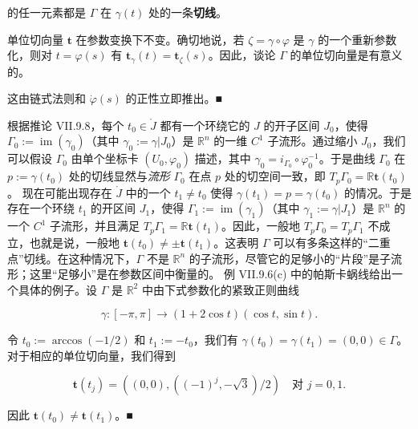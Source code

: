 的任一元素都是 $ \Gamma $ 在 $ \gamma(t) $ 处的一条\textbf{切线}。

\begin{remark}

\begin{items}
\item

单位切向量 $ \mathbf{t} $ 在参数变换下不变。确切地说，若 $ \zeta = \gamma \circ \varphi $ 是 $ \gamma $ 的一个重新参数化，则对 $ t = \varphi(s) $ 有 $ \mathbf{t}_{\gamma}(t) = \mathbf{t}_{\zeta}(s) $。因此，谈论 $ \Gamma $ 的单位切向量是有意义的。

\proofhead
这由链式法则和 $ \dot\varphi(s) $ 的正性立即推出。\nobreak\hspace{0.35em}■
\item

根据推论 VII.9.8，每个 $ t_0 \in \mathring{J} $ 都有一个环绕它的 $ J $ 的开子区间 $ J_0 $，使得 $ \Gamma_0 := \operatorname{im}(\gamma_0) $（其中 $ \gamma_0 := \gamma|J_0 $）是 $ \mathbb{R}^n $ 的一维 $ C^1 $ 子流形。通过缩小 $ J_0 $，我们可以假设 $ \Gamma_0 $ 由单个坐标卡 $ (U_0, \varphi_0) $ 描述，其中 $ \gamma_0 = i_{\Gamma_0} \circ \varphi_0^{-1} $。于是曲线 $ \Gamma_0 $ 在 $ p := \gamma(t_0) $ 处的切线显然与\emph{流形} $ \Gamma_0 $ 在点 $ p $ 处的切空间一致，即 $ T_p\Gamma_0 = \mathbb{R}\mathbf{t}(t_0) $。
现在可能出现存在 $ \mathring{J} $ 中的一个 $ t_1 \ne t_0 $ 使得 $ \gamma(t_1) = p = \gamma(t_0) $ 的情况。于是存在一个环绕 $ t_1 $ 的开区间 $ J_1 $，使得 $ \Gamma_1 := \operatorname{im}(\gamma_1) $（其中 $ \gamma_1 := \gamma|J_1 $）是 $ \mathbb{R}^n $ 的一个 $ C^1 $ 子流形，并且满足 $ T_p\Gamma_1 = \mathbb{R}\mathbf{t}(t_1) $。因此，一般地 $ T_p\Gamma_0 = T_p\Gamma_1 $ 不成立，也就是说，一般地 $ \mathbf{t}(t_0) \ne \pm\mathbf{t}(t_1) $。这表明 $ \Gamma $ 可以有多条这样的“二重点”切线。在这种情况下，$ \Gamma $ 不是 $ \mathbb{R}^n $ 的子流形，尽管它的足够小的“片段”是子流形；这里“足够小”是在参数区间中衡量的。
例 VII.9.6(c) 中的帕斯卡蜗线给出一个具体的例子。设 $ \Gamma $ 是 $ \mathbb{R}^2 $ 中由下式参数化的紧致正则曲线

\[
\gamma : [-\pi, \pi] \to (1 + 2\cos t)(\cos t, \sin t) .
\]

令 $ t_0 := \arccos(-1/2) $ 和 $ t_1 := -t_0 $，我们有 $ \gamma(t_0) = \gamma(t_1) = (0, 0) \in \Gamma $。对于相应的单位切向量，我们得到

\[
\mathbf{t}(t_j) = ((0, 0), ((-1)^j, -\sqrt{3})/2) \quad \text{对 } j = 0, 1 .
\]

因此 $ \mathbf{t}(t_0) \ne \mathbf{t}(t_1) $。\nobreak\hspace{0.35em}■

\end{items}

\end{remark}

